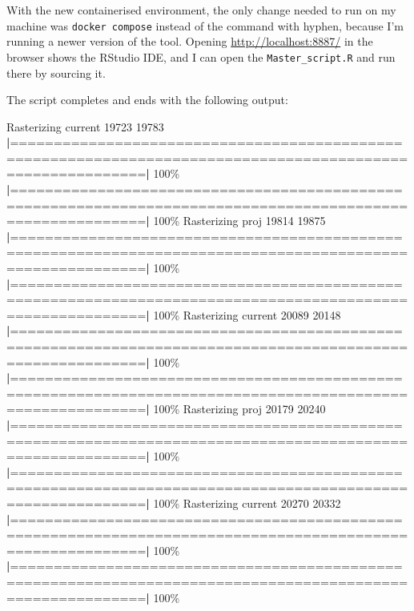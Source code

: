 \documentclass[
  a4paper,
]{article}
\newenvironment{Shaded}{\begin{snugshade}}{\end{snugshade}}
\newcommand{\ExtensionTok}[1]{#1}
\newcommand{\KeywordTok}[1]{\textcolor[rgb]{0.13,0.29,0.53}{\textbf{#1}}}
\newcommand{\NormalTok}[1]{#1}
\begin{document}
With the new containerised environment, the only change needed to run on
my machine was \texttt{docker\ compose} instead of the command with
hyphen, because I'm running a newer version of the tool. Opening
\url{http://localhost:8887/} in the browser shows the RStudio IDE, and I
can open the \texttt{Master\_script.R} and run there by sourcing it.

The script completes and ends with the following output:

\scriptsize

\begin{Shaded}
\begin{Highlighting}[]
\ExtensionTok{Rasterizing}\NormalTok{ current 19723 19783 }
  \KeywordTok{|}\ExtensionTok{===========================================================================================================}\KeywordTok{|} \ExtensionTok{100\%}
  \KeywordTok{|}\ExtensionTok{===========================================================================================================}\KeywordTok{|} \ExtensionTok{100\%}
\ExtensionTok{Rasterizing}\NormalTok{ proj 19814 19875 }
  \KeywordTok{|}\ExtensionTok{===========================================================================================================}\KeywordTok{|} \ExtensionTok{100\%}
  \KeywordTok{|}\ExtensionTok{===========================================================================================================}\KeywordTok{|} \ExtensionTok{100\%}
\ExtensionTok{Rasterizing}\NormalTok{ current 20089 20148 }
  \KeywordTok{|}\ExtensionTok{===========================================================================================================}\KeywordTok{|} \ExtensionTok{100\%}
  \KeywordTok{|}\ExtensionTok{===========================================================================================================}\KeywordTok{|} \ExtensionTok{100\%}
\ExtensionTok{Rasterizing}\NormalTok{ proj 20179 20240 }
  \KeywordTok{|}\ExtensionTok{===========================================================================================================}\KeywordTok{|} \ExtensionTok{100\%}
  \KeywordTok{|}\ExtensionTok{===========================================================================================================}\KeywordTok{|} \ExtensionTok{100\%}
\ExtensionTok{Rasterizing}\NormalTok{ current 20270 20332 }
  \KeywordTok{|}\ExtensionTok{===========================================================================================================}\KeywordTok{|} \ExtensionTok{100\%}
  \KeywordTok{|}\ExtensionTok{===========================================================================================================}\KeywordTok{|} \ExtensionTok{100\%}

\end{Highlighting}
\end{Shaded}
\end{document}
